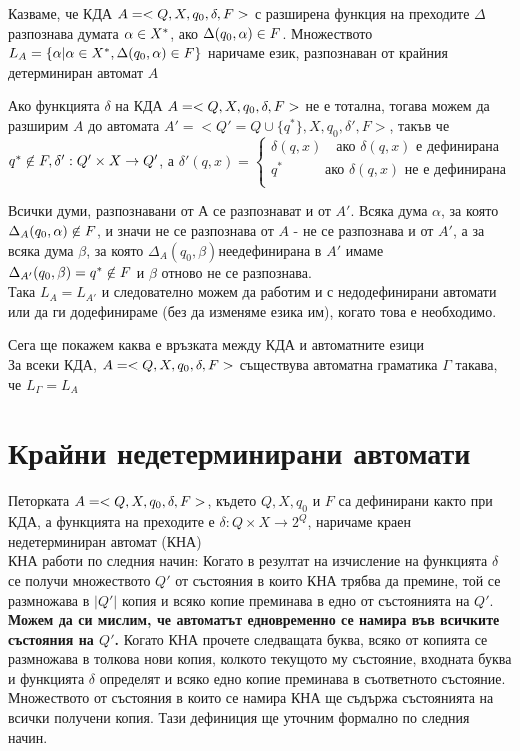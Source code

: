 \documentclass[11pt]{article}
\begin{document}
 Казваме, че КДА $A = <Q, X, q_{0}, \delta, F> $ с разширена функция на преходите $\Delta$ разпознава думата $\alpha \in X^{*}$, ако $\Delta(q_{0}, \alpha) \in F$. Множеството $L_{A} = \{\alpha| \alpha \in X^{*}, \Delta(q_{0}, \alpha) \in F\}$ наричаме език, разпознаван от крайния детерминиран автомат $A$ \par
Ако функцията $\delta$ на КДА $A = <Q, X, q_{0}, \delta, F>$ не е тотална, тогава можем да разширим $A$ до автомата 
$A' = < Q' = Q \cup \{q^{*}\}, X, q_{0}, \delta', F>$, такъв че 
$q^{*} \centernot\in F, \delta' : Q' \times X \to Q'$, а
$\delta'(q, x) = 
	\begin{cases}
		\delta(q,x) \quad \text{ако } \delta(q,x) 
		\text{ е дефинирана}\\
		q^{*} \quad \quad \quad \text{ако } \delta(q,x)
		\text{ не е дефинирана} \\
	\end{cases}$\par
Всички думи, разпознавани от $А$ се разпознават и от $A'$. Всяка дума $\alpha$, за която 
$\Delta_{A}(q_{0},\alpha) \notBelongsTo F$, и значи не се разпознава от $A$ - не се разпознава и от $A'$, а за всяка дума $\beta$, за която 
$\Delta_{A}(q_{0}, \beta) не е дефинирана$ в $A'$ имаме
$\Delta_{A'}(q_{0}, \beta) = q^{*} \notBelongsTo F$ и $\beta$ отново не се разпознава. \\
Така $L_{A} = L_{A'}$ и следователно можем да работим и с недодефинирани автомати или да ги додефинираме (без да изменяме езика им), когато това е необходимо. \par
Сега ще покажем каква е връзката между КДА и автоматните езици\\
 За всеки КДА, $A = <Q, X, q_{0}, \delta, F>$ съществува автоматна граматика $\Gamma$ такава, че $L_{\Gamma} = L_{A}$

\section{Крайни недетерминирани автомати}
 Петорката $A = <Q, X, q_{0}, \delta, F>$, където $Q, X, q_{0}$ и $F$ са дефинирани както при КДА, а функцията на преходите е $\delta : Q \times X \to 2^{Q}$, наричаме краен недетерминиран автомат (КНА) \\

КНА работи по следния начин: Когато в резултат на изчисление на функцията $\delta$ се получи множеството $Q'$ от състояния в които КНА трябва да премине, той се размножава в $|Q'|$ копия и всяко копие преминава в едно от състоянията на $Q'$. \textbf{Можем да си мислим, че автоматът едновременно се намира във всичките състояния на $Q'$.} Когато КНА прочете следващата буква, всяко от копията се размножава в толкова нови копия, колкото текущото му състояние, входната буква и функцията $\delta$ определят и всяко едно копие преминава в съответното състояние. Множеството от състояния в които се намира КНА ще съдържа състоянията на всички получени копия. Тази дефиниция ще уточним формално по следния начин.\\
\end{document}
